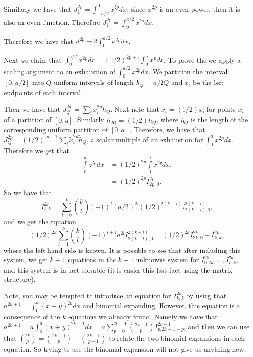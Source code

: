 \begin{enumerate}
Similarly we have that \(J^{2p}_1 = \int_{-a/2}^0 x^{2p} dx\); since \(x^{2p}\) is an even power, then it 
is also an even function. Therefore \(J^{2p}_1 = \int_0^{a/2} x^{2p} dx\).

Therefore we have that \(J^{2p} = 2 \int_0^{a/2} x^{2p} dx\).

Next we claim that \(\int_0^{a/2} x^{2p} dx = (1/2)^{2p+1}\int_0^a x^p dx\). To prove the we apply a scaling
argument to an exhaustion of \(\int_0^{a/2}x^{2p} dx\). We partition the interval \([0, a/2]\) into \(Q\)
uniform intervals of length \(h_Q = a / 2Q\) and \(x_i\) be the left endpoints of each interval. 

Then we have that \(J^{2p}_Q \coloneqq \sum\limits_i x_i^{2p} h_Q\). Next note that \(x_i = (1/2) \tilde x_i\)
for points \(\tilde x_i\) of a partition of \([0, a]\). Similarly \(h_{2Q} = (1/2) \tilde h_Q\), where
\(\tilde h_Q\) is the length of
the corresponding uniform partition of \([0, a]\). Therefore, we have that 
\(J^{2p}_Q = (1/2)^{2p + 1} \sum\limits_i \tilde x_i^{2p} \tilde h_Q\), a scalar multiple of an exhaustion for
\(\int_0^a x^{2p} dx\). Therefore we get that
\begin{align}
\int\limits_0^a z^{2p} dx & = (1/2)^{2p} \int\limits_0^a x^{2p} dx, \\
    & = (1/2)^{2p} I^{2p}_{2p, 0}.
\end{align}
So we have that
\begin{equation}
I^{2k}_{k, k} = \sum\limits_{l=0}^k {k \choose l} (-1)^l (a/2)^{2l} (1/2)^{2(k-l)} I^{2(k-l)}_{2(k-l), 0},
\end{equation}
and we get the equation
\begin{equation}
(1/2)^{2k} \sum\limits_{l=1}^k {k \choose l} (-1)^{l+1} a^{2l} I^{2(k-l)}_{2(k-l), 0} = 
    (1/2)^{2k} I^{2k}_{2k, 0} - I^{2k}_{k, k},
\end{equation}
where the left hand side is known. It is possible to see that after including this system, we get \(k+1\) equations
in the \(k+1\) unknowns system for \(I^{2k}_{0, 2k}, ..., I^{2k}_{k,k}\), and this system is in fact 
solvable (it is easier this last fact using the matrix structure). 
\end{enumerate}

Note, you may be tempted to introduce an equation for \(I^{2k}_{k, k}\) by using that
\(a^{2k+1} = \int_0^a (x + y)^{2k} dx\) and binomial expanding. However, this equation is a consequence
of the \(k\) equations we already found. Namely we have that
 \(a^{2k+1} = a \int_0^a(x+y)^{2k-1}dx = a\sum_{p=0}^{2k-1} {2k-1 \choose p} I^{2k-1}_{p, 2k-1-p}\), and
then we can use that
\({2k \choose p} = {2k-1 \choose p} + {2k-1 \choose p-1}\) to relate the two binomial expansions in each equation. 
So trying to use the binomial expansion will not give us anything new. 

